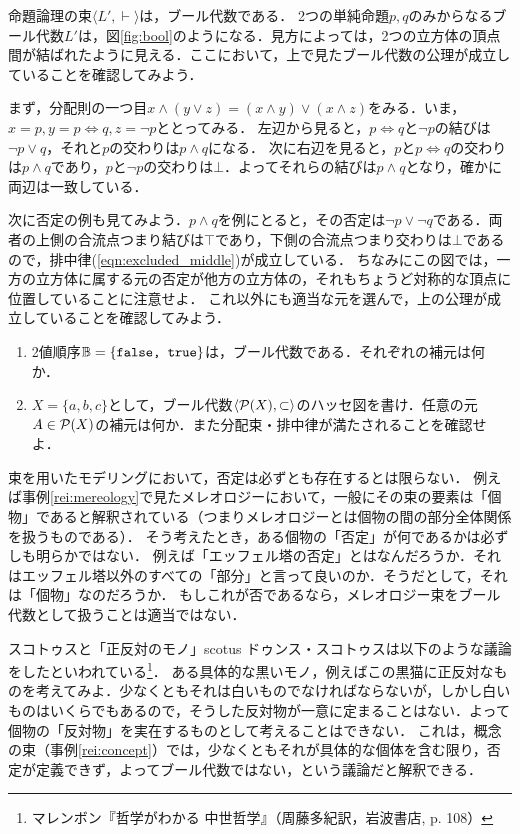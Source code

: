 \documentclass[11pt,a4paper, dvipdfmx]{jsarticle}
\begin{document}
\begin{rei}{}{}
    命題論理の束$\langle L', \vdash \rangle$は，ブール代数である．
    2つの単純命題$p, q$のみからなるブール代数$L'$は，図\ref{fig:bool}のようになる．見方によっては，2つの立方体の頂点間が結ばれたように見える．ここにおいて，上で見たブール代数の公理が成立していることを確認してみよう．

    まず，分配則の一つ目$x \wedge (y \vee z) = (x \wedge y) \vee (x \wedge z) $をみる．いま，$x = p, y = p \iff q, z = \neg p$ととってみる．
    左辺から見ると，$p \iff q$と$\neg p$の結びは$\neg p \vee q$，それと$p$の交わりは$p \wedge q$になる．
    次に右辺を見ると，$p$と$p \iff q$の交わりは$p \wedge q$であり，$p$と$\neg p$の交わりは$\bot$．よってそれらの結びは$p \wedge q$となり，確かに両辺は一致している．
    
    次に否定の例も見てみよう．$p \wedge q$を例にとると，その否定は$\neg p \vee \neg q$である．両者の上側の合流点つまり結びは$\top$であり，下側の合流点つまり交わりは$\bot$であるので，排中律(\ref{eqn:excluded_middle})が成立している．
    ちなみにこの図では，一方の立方体に属する元の否定が他方の立方体の，それもちょうど対称的な頂点に位置していることに注意せよ．
    これ以外にも適当な元を選んで，上の公理が成立していることを確認してみよう．
\end{rei}

\begin{renshu}{}{}
 \begin{enumerate}
    \item 2値順序$\mathbb{B} = \{ \texttt{false, true} \}$は，ブール代数である．それぞれの補元は何か．
    \item $X = \{a, b, c\}$として，ブール代数$\langle \mathcal{P}(X), \subset \rangle$のハッセ図を書け．任意の元$A \in \mathcal{P}(X)$の補元は何か．また分配束・排中律が満たされることを確認せよ．
 \end{enumerate}
\end{renshu}

束を用いたモデリングにおいて，否定は必ずとも存在するとは限らない．
例えば事例\ref{rei:mereology}で見たメレオロジーにおいて，一般にその束の要素は「個物」であると解釈されている（つまりメレオロジーとは個物の間の部分全体関係を扱うものである）．
そう考えたとき，ある個物の「否定」が何であるかは必ずしも明らかではない．
例えば「エッフェル塔の否定」とはなんだろうか．それはエッフェル塔以外のすべての「部分」と言って良いのか．そうだとして，それは「個物」なのだろうか．
もしこれが否であるなら，メレオロジー束をブール代数として扱うことは適当ではない．


\begin{rei}{スコトゥスと「正反対のモノ」}{scotus}
 ドゥンス・スコトゥスは以下のような議論をしたといわれている\footnote{マレンボン『哲学がわかる 中世哲学』（周藤多紀訳，岩波書店, p. 108）}． ある具体的な黒いモノ，例えばこの黒猫に正反対なものを考えてみよ．少なくともそれは白いものでなければならないが，しかし白いものはいくらでもあるので，そうした反対物が一意に定まることはない．よって個物の「反対物」を実在するものとして考えることはできない．
 これは，概念の束（事例\ref{rei:concept}）では，少なくともそれが具体的な個体を含む限り，否定が定義できず，よってブール代数ではない，という議論だと解釈できる．
\end{rei}
\end{document}

